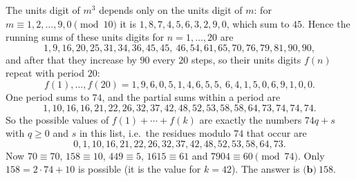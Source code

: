 The units digit of $m^3$ depends only on the units digit of $m$: for $m\equiv1,2,\dots,9,0\pmod{10}$ it is $1,8,7,4,5,6,3,2,9,0$, which sum to $45$. Hence the running sums of these units digits for $n=1,\dots,20$ are
\[
1,9,16,20,25,31,34,36,45,45,\ 46,54,61,65,70,76,79,81,90,90,
\]
and after that they increase by $90$ every $20$ steps, so their units digits $f(n)$ repeat with period $20$:
\[
f(1),\dots,f(20)=1,9,6,0,5,1,4,6,5,5,\ 6,4,1,5,0,6,9,1,0,0 .
\]
One period sums to $74$, and the partial sums within a period are
\[
1,10,16,16,21,22,26,32,37,42,48,52,53,58,58,64,73,74,74,74 .
\]
So the possible values of $f(1)+\cdots+f(k)$ are exactly the numbers $74q+s$ with $q\ge0$ and $s$ in this list, i.e.\ the residues modulo $74$ that occur are
\[
0,1,10,16,21,22,26,32,37,42,48,52,53,58,64,73 .
\]
Now $70\equiv70$, $158\equiv10$, $449\equiv5$, $1615\equiv61$ and $7904\equiv60\pmod{74}$. Only $158=2\cdot74+10$ is possible (it is the value for $k=42$). The answer is $\boxed{\textbf{(b)}\ 158}$.
